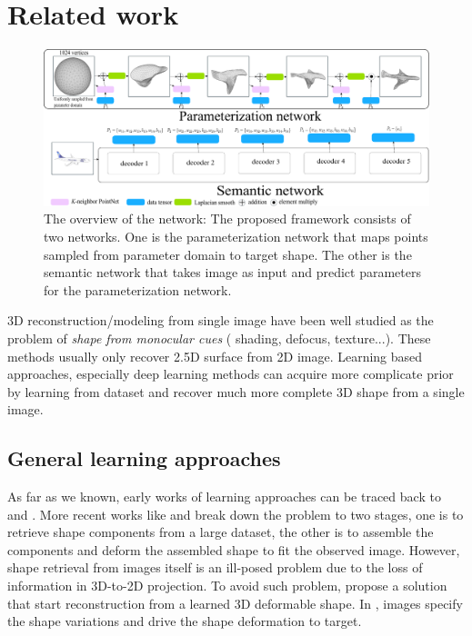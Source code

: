 \section{Related work}
\begin{figure}[htbp]
	\centering
	\includegraphics[width=\linewidth]{img/net/overview}
	\caption{The overview of the network: The proposed framework consists of two networks. One is the parameterization network that maps points sampled from parameter domain to target shape. The other is the semantic network that takes image as input and predict parameters for the parameterization network.}
	\label{fig:overview}
\end{figure}
3D reconstruction/modeling from single image have been well studied as the problem of \emph{shape from monocular cues} ( shading\cite{shapefromshadingsurvey}, defocus\cite{shapefromdf1,shapefromdf2}, texture\cite{Aloimonos1988}...). These methods usually only recover 2.5D surface from 2D image. Learning based approaches, especially deep learning methods can acquire more complicate prior by learning from dataset and recover much more complete 3D shape from a single image.
 
\subsection{General learning approaches}
As far as we known, early works of learning approaches can be traced back to \cite{Hoiem2007} and \cite{learn3D2007}. More recent works like \cite{Su:2014} and \cite{jointimgshape} break down the problem to two stages, one is to retrieve shape components from a large dataset, the other is to assemble the components and deform the assembled shape to fit the observed image. However, shape retrieval from images itself
is an ill-posed problem due to the loss of information in 3D-to-2D projection. To avoid such problem, \cite{imgrecon15} propose a solution that start reconstruction from a learned 3D deformable shape. 
In \cite{imgrecon15}, images specify the shape variations and drive the shape deformation to target.


